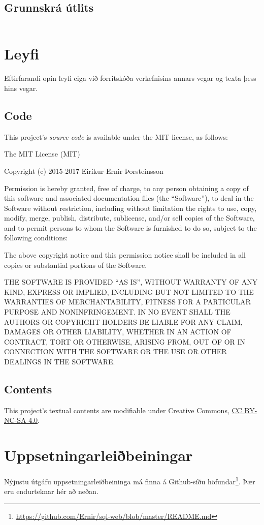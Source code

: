 \documentclass[a4paper,12pt,twoside,BCOR=10mm]{scrbook}
\begin{document}
\section{Grunnskrá útlits}
\label{code:base-template}
\inputminted[fontsize=\scriptsize, frame=lines, linenos=true, label=base.html]{django}{../templates/base.html}

\chapter{Leyfi}
\label{sec:license}
Eftirfarandi opin leyfi eiga við forritskóða verkefnisins annars vegar og texta þess hins vegar.
\section{Code}\label{code}

This project's \emph{source code} is available under the MIT license, as
follows:

The MIT License (MIT)

Copyright (c) 2015-2017 Eiríkur Ernir Þorsteinsson

Permission is hereby granted, free of charge, to any person obtaining a
copy of this software and associated documentation files (the
``Software''), to deal in the Software without restriction, including
without limitation the rights to use, copy, modify, merge, publish,
distribute, sublicense, and/or sell copies of the Software, and to
permit persons to whom the Software is furnished to do so, subject to
the following conditions:

The above copyright notice and this permission notice shall be included
in all copies or substantial portions of the Software.

THE SOFTWARE IS PROVIDED ``AS IS'', WITHOUT WARRANTY OF ANY KIND,
EXPRESS OR IMPLIED, INCLUDING BUT NOT LIMITED TO THE WARRANTIES OF
MERCHANTABILITY, FITNESS FOR A PARTICULAR PURPOSE AND NONINFRINGEMENT.
IN NO EVENT SHALL THE AUTHORS OR COPYRIGHT HOLDERS BE LIABLE FOR ANY
CLAIM, DAMAGES OR OTHER LIABILITY, WHETHER IN AN ACTION OF CONTRACT,
TORT OR OTHERWISE, ARISING FROM, OUT OF OR IN CONNECTION WITH THE
SOFTWARE OR THE USE OR OTHER DEALINGS IN THE SOFTWARE.

\section{Contents}\label{contents}

This project's textual contents are modifiable under Creative Commons,
\href{http://creativecommons.org/licenses/by-nc-sa/4.0/}{CC BY-NC-SA
4.0}.

\chapter{Uppsetningarleiðbeiningar}
\label{sec:installation}
Nýjustu útgáfu uppsetningarleiðbeininga má finna á Github-síðu höfundar\footnote{\url{https://github.com/Ernir/sql-web/blob/master/README.md}}. Þær eru endurteknar hér að neðan.


\end{document}
